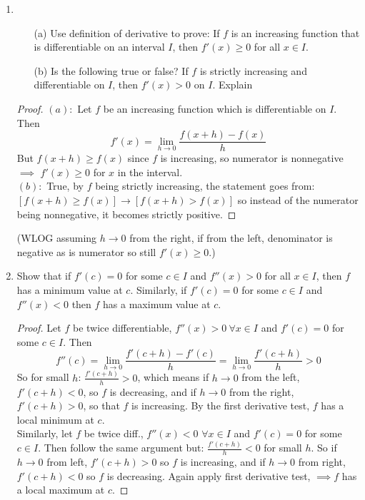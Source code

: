 \documentclass[hidelinks,12pt]{article}
\renewcommand{\geq}{\geqslant}
\begin{document}
\begin{enumerate}
\begin{proof}
\begin{itemize}
            \item At $x=0,\ \left(f^{-1}\right)'\left(y\right)=\frac{1}{2}$
            \item At $x=1,\ \left(f^{-1}\right)'\left(y\right)=\frac{1}{5}$
            \item At $x=-1,\ \left(f^{-1}\right)'\left(y\right)=\frac{1}{5}$
        \end{itemize}
    \end{proof}
    \item\begin{enumerate}
        \item[(a)] Use definition of derivative to prove: If $f$ is an increasing function that is differentiable on an interval $I$, then $f'\left(x\right)\geq0$ for all $x\in I$.
        \item[(b)] Is the following true or false? If $f$ is strictly increasing and differentiable on $I$, then $f'\left(x\right)>0$ on $I$. Explain
    \end{enumerate}
    \begin{proof}
        $\left(a\right):$ Let $f$ be an increasing function which is differentiable on $I$. Then $$f'\left(x\right)=\lim_{h\to0}\frac{f\left(x+h\right)-f\left(x\right)}{h}$$ But $f\left(x+h\right)\geq f\left(x\right)$ since $f$ is increasing, so numerator is nonnegative $\implies$ $f'\left(x\right)\geq0$ for $x$ in the interval.\\
        $\left(b\right):$ True, by $f$ being strictly increasing, the statement goes from: $[f\left(x+h\right)\geq f\left(x\right)]\to[f\left(x+h\right)>f\left(x\right)]$ so instead of the numerator being nonnegative, it becomes strictly positive.
    \end{proof} (WLOG assuming $h\to 0$ from the right, if from the left, denominator is negative as is numerator so still $f'\left(x\right)\geq0$.)
    \item Show that if $f'\left(c\right)=0$ for some $c\in I$ and $f''\left(x\right)>0$ for all $x\in I$, then $f$ has a minimum value at $c$. Similarly, if $f'\left(c\right)=0$ for some $c\in I$ and $f''\left(x\right)<0$ then $f$ has a maximum value at $c$.\begin{proof}
        Let $f$ be twice differentiable, $f''\left(x\right)>0\ \forall x\in I$ and $f'\left(c\right)=0$ for some $c\in I$. Then $$f''\left(c\right)=\lim_{h\to0}\frac{f'\left(c+h\right)-f'\left(c\right)}{h}=\lim_{h\to0}\frac{f'\left(c+h\right)}{h}>0$$ So for small $h$: $\frac{f'\left(c+h\right)}{h}>0$, which means if $h\to0$ from the left, $f'\left(c+h\right)<0$, so $f$ is decreasing, and if $h\to0$ from the right, $f'\left(c+h\right)>0$, so that $f$ is increasing. By the first derivative test, $f$ has a local minimum at $c$.\\ Similarly, let $f$ be twice diff., $f''\left(x\right)<0$ $\forall x\in I$ and $f'\left(c\right)=0$ for some $c\in I$. Then follow the same argument but: $\frac{f'\left(c+h\right)}{h}<0$ for small $h$. So if $h\to0$ from left, $f'\left(c+h\right)>0$ so $f$ is increasing, and if $h\to0$ from right, $f'\left(c+h\right)<0$ so $f$ is decreasing. Again apply first derivative test, $\implies f$ has a local maximum at $c$.

\end{proof}
\end{enumerate}
\end{document}

